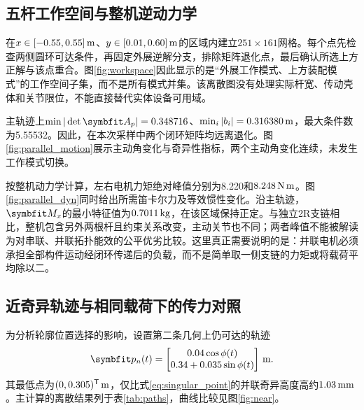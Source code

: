 \subsection{五杆工作空间与整机逆动力学}

在$x\in[-0.55,0.55]\,\mathrm{m}$、$y\in[0.01,0.60]\,\mathrm{m}$的区域内建立$251\times161$网格。每个点先检查两侧圆环可达条件，再固定外展逆解分支，排除矩阵退化点，最后确认所选上方正解与该点重合。图\ref{fig:workspace}因此显示的是“外展工作模式、上方装配模式”的工作空间子集，而不是所有模式并集。该离散图没有处理实际杆宽、传动壳体和关节限位，不能直接替代实体设备可用域。


主轨迹上$\min|\det\vect A_p|=0.348716$、$\min_i|b_i|=0.316380\,\mathrm{m}$，最大条件数为5.55532。因此，在本次采样中两个闭环矩阵均远离退化。图\ref{fig:parallel_motion}展示主动角变化与奇异性指标，两个主动角变化连续，未发生工作模式切换。


按整机动力学计算，左右电机力矩绝对峰值分别为8.220和$8.248\,\mathrm{N\,m}$。图\ref{fig:parallel_dyn}同时给出所需笛卡尔力及等效惯性变化。沿主轨迹，$\vect M_x$的最小特征值为$0.7011\,\mathrm{kg}$，在该区域保持正定。与独立2R支链相比，整机包含另外两根杆且约束关系改变，主动关节也不同；两者峰值不能被解读为对串联、并联拓扑能效的公平优劣比较。这里真正需要说明的是：并联电机必须承担全部构件运动经闭环传递后的负载，而不是简单取一侧支链的力矩或将载荷平均除以二。


\subsection{近奇异轨迹与相同载荷下的传力对照}
\label{sec:near}

为分析轮廓位置选择的影响，设置第二条几何上仍可达的轨迹
\begin{equation}
\vect p_n(t)=\begin{bmatrix}0.04\cos\phi(t)\\0.34+0.035\sin\phi(t)\end{bmatrix}\units m.
\end{equation}
其最低点为$(0,0.305)^\mathsf T\,\mathrm{m}$，仅比式\eqref{eq:singular_point}的并联奇异高度高约$1.03\,\mathrm{mm}$。主计算的离散结果列于表\ref{tab:paths}，曲线比较见图\ref{fig:near}。


